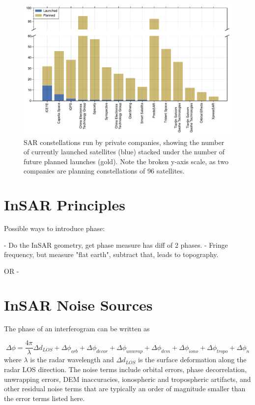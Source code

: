 \begin{figure}[!htbp]
	\centering
	\includegraphics[width=1.0\textwidth]{figures/chapter3-sar/sar-private-constellations.pdf}
	\caption[Private sector SAR constellations]{SAR constellations run by private companies, showing the number of currently launched satellites (blue) stacked under the number of future planned launches (gold). Note the broken y-axis scale, as two companies 
		are planning constellations of 96 satellites.
	}
	\label{fig:sar-private-const}
\end{figure}



\section{InSAR Principles}


Possible ways to introduce phase:

- Do the InSAR geometry, get phase measure has diff of 2 phases.
- Fringe frequency, but measure "flat earth", subtract that, leads to topography.

OR
- 

\section{InSAR Noise Sources}
\label{sec:ch3-noise}

The phase of an interferogram can be written as

\citep{Zebker1992DecorrelationInterferometricRadar, Zebker1994AccuracyTopographicMaps, Zebker1997AtmosphericEffectsInterferometric}
\begin{equation}
	\Delta \phi = \frac{4 \pi}{\lambda} \Delta d_{LOS} +  \Delta \phi_{orb} + \Delta \phi_{decor} + \Delta \phi_{unwrap}  + \Delta \phi_{dem} + \Delta \phi_{iono} + \Delta \phi_{tropo}  + \Delta \phi_{n}
\end{equation}
where $ \lambda $ is the radar wavelength and $ \Delta d_{LOS} $ is the surface deformation along the radar LOS direction. The noise terms include orbital errors, phase decorrelation, unwrapping errors, DEM inaccuracies, ionospheric and tropospheric artifacts, and other residual noise terms that are typically an order of magnitude smaller than the error terms listed here.


